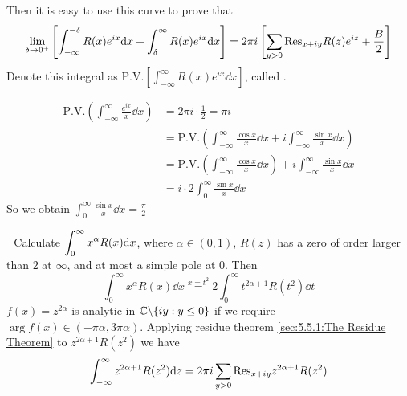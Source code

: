 Then it is easy to use this curve to prove that 
\begin{equation*}
    \lim_{\delta\to 0^+}\left[\int_{-\infty}^{-\delta}R(x)e^{ix}\mathrm{d} x+\int_{\delta}^\infty R(x)e^{ix}\mathrm{d} x\right]=2\pi i \left[\sum_{y>0}\mathrm{Res}_{x+iy}R(z)e^{iz}+\frac{B}{2}\right]
\end{equation*}
Denote this integral as  $ \mathrm{P.V.}\left[\int_{-\infty}^\infty R(x)e^{ix}\dd x\right] $, called .

\begin{example}
    \begin{align*}
        \mathrm{P.V.}\left(\int_{-\infty}^\infty \frac{e^{ix}}{x}\dd x\right)&=2\pi i \cdot\frac{1 }{2}=\pi i\\
        &=\mathrm{P.V.}\left(\int_{-\infty}^\infty \frac{\cos x}{x}\dd x+i\int_{-\infty}^\infty\frac{\sin x}{x}\dd x\right)\\
        &=\mathrm{P.V.}\left(\int_{-\infty}^\infty \frac{\cos x}{x}\dd x\right)+i\int_{-\infty}^\infty \frac{\sin x}{x}\dd x\\
        &=i\cdot 2\int_{0}^\infty\frac{\sin x}{x}\dd x
    \end{align*}
    So we obtain  $ \int_0^\infty\frac{\sin x}{x}\dd x=\frac{\pi }{2} $ 
\end{example}
\noindent{}\,\,\,\,Calculate  $ \displaystyle\int_0^\infty x^\alpha R(x)\mathrm{d} x $, where  $ \alpha\in(0,1) $, $ R(z) $ has a zero of order larger than  $ 2 $ at  $ \infty $, and at most a simple pole at  $ 0 $.
Then 
\begin{equation}
    \int_0^\infty x^\alpha R(x)\dd x\overset{x=t^2}{=}2\int_0^\infty t^{2\alpha+1}R(t^2)\dd t
\end{equation}
$ f(x)=z^{2\alpha } $ is analytic in  $ \mathbb C\backslash\{iy:y \leq 0\} $ if we require  $ \arg f(x)\in(-\pi \alpha,3\pi\alpha) $. Applying residue theorem \ref{sec:5.5.1:The Residue Theorem} to  $ z^{2\alpha+1}R(z^2) $ we have 
\begin{equation*}
    \int_{-\infty}^\infty z^{2\alpha+1}R(z^2)\mathrm{d} z=2\pi i\sum_{y>0}\mathrm{Res}_{x+iy}z^{2\alpha+1}R(z^2)
\end{equation*}
